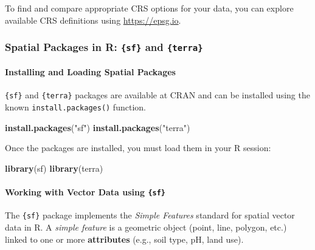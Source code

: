 \documentclass[
  10pt,
  b5paper,
  oneside]{book}
\newenvironment{Shaded}{\begin{snugshade}}{\end{snugshade}}
\newcommand{\FunctionTok}[1]{\textcolor[rgb]{0.13,0.29,0.53}{\textbf{#1}}}
\newcommand{\NormalTok}[1]{#1}
\newcommand{\StringTok}[1]{\textcolor[rgb]{0.31,0.60,0.02}{#1}}
\begin{document}
To find and compare appropriate CRS options for your data, you can explore available CRS definitions using \href{https://epsg.io/}{https://epsg.io}.

\subsubsection{\texorpdfstring{Spatial Packages in R: \texttt{\{sf\}} and \texttt{\{terra\}}}{Spatial Packages in R: \{sf\} and \{terra\}}}\label{spatial-packages-in-r-sf-and-terra}

\paragraph*{Installing and Loading Spatial Packages}\label{installing-and-loading-spatial-packages}

\texttt{\{sf\}} and \texttt{\{terra\}} packages are available at CRAN and can be installed using the known \texttt{install.packages()} function.

\begin{Shaded}
\begin{Highlighting}[]
  \FunctionTok{install.packages}\NormalTok{(}\StringTok{"sf"}\NormalTok{)}
  \FunctionTok{install.packages}\NormalTok{(}\StringTok{"terra"}\NormalTok{)}
\end{Highlighting}
\end{Shaded}

Once the packages are installed, you must load them in your R session:

\begin{Shaded}
\begin{Highlighting}[]
  \FunctionTok{library}\NormalTok{(sf)}
  \FunctionTok{library}\NormalTok{(terra)}
\end{Highlighting}
\end{Shaded}

\paragraph*{\texorpdfstring{Working with Vector Data using \texttt{\{sf\}}}{Working with Vector Data using \{sf\}}}\label{working-with-vector-data-using-sf}

The \texttt{\{sf\}} package implements the \emph{Simple Features} standard for spatial vector data in R. A \emph{simple feature} is a geometric object (point, line, polygon, etc.) linked to one or more \textbf{attributes} (e.g., soil type, pH, land use).
\end{document}
